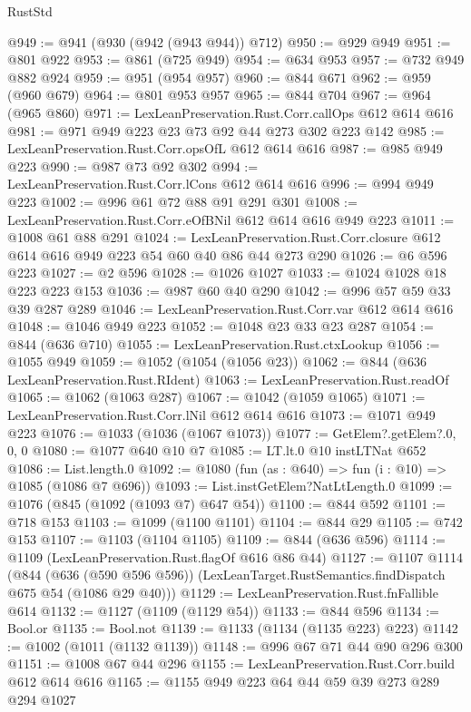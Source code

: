 \begin{lexlean}{RustStd}
\begin{coremodule}
{\begin{coremodule}
{{{{{{{{@949 := @941 (@930 (@942 (@943 @944)) @712)
@950 := @929 @949
@951 := @801 @922
@953 := @861 (@725 @949)
@954 := @634 @953
@957 := @732 @949 @882 @924
@959 := @951 (@954 @957)
@960 := @844 @671
@962 := @959 (@960 @679)
@964 := @801 @953 @957
@965 := @844 @704
@967 := @964 (@965 @860)
@971 := LexLeanPreservation.Rust.Corr.callOps @612 @614 @616
@981 := @971 @949 @223 @23 @73 @92 @44 @273 @302 @223 @142
@985 := LexLeanPreservation.Rust.Corr.opsOfL @612 @614 @616
@987 := @985 @949 @223
@990 := @987 @73 @92 @302
@994 := LexLeanPreservation.Rust.Corr.lCons @612 @614 @616
@996 := @994 @949 @223
@1002 := @996 @61 @72 @88 @91 @291 @301
@1008 := LexLeanPreservation.Rust.Corr.eOfBNil @612 @614 @616 @949 @223
@1011 := @1008 @61 @88 @291
@1024 := LexLeanPreservation.Rust.Corr.closure
    @612
    @614
    @616
    @949
    @223
    @54
    @60
    @40
    @86
    @44
    @273
    @290
@1026 := @6 @596 @223
@1027 := @2 @596
@1028 := @1026 @1027
@1033 := @1024 @1028 @18 @223 @223 @153
@1036 := @987 @60 @40 @290
@1042 := @996 @57 @59 @33 @39 @287 @289
@1046 := LexLeanPreservation.Rust.Corr.var @612 @614 @616
@1048 := @1046 @949 @223
@1052 := @1048 @23 @33 @23 @287
@1054 := @844 (@636 @710)
@1055 := LexLeanPreservation.Rust.ctxLookup
@1056 := @1055 @949
@1059 := @1052 (@1054 (@1056 @23))
@1062 := @844 (@636 LexLeanPreservation.Rust.RIdent)
@1063 := LexLeanPreservation.Rust.readOf
@1065 := @1062 (@1063 @287)
@1067 := @1042 (@1059 @1065)
@1071 := LexLeanPreservation.Rust.Corr.lNil @612 @614 @616
@1073 := @1071 @949 @223
@1076 := @1033 (@1036 (@1067 @1073))
@1077 := GetElem?.getElem?.{0, 0, 0}
@1080 := @1077 @640 @10 @7
@1085 := LT.lt.{0} @10 instLTNat @652
@1086 := List.length.{0}
@1092 := @1080 (fun (as : @640) => fun (i : @10) => @1085 (@1086 @7 @696))
@1093 := List.instGetElem?NatLtLength.{0}
@1099 := @1076 (@845 (@1092 (@1093 @7) @647 @54))
@1100 := @844 @592
@1101 := @718 @153
@1103 := @1099 (@1100 @1101)
@1104 := @844 @29
@1105 := @742 @153
@1107 := @1103 (@1104 @1105)
@1109 := @844 (@636 @596)
@1114 := @1109 (LexLeanPreservation.Rust.flagOf @616 @86 @44)
@1127 := @1107
    @1114
    (@844
      (@636 (@590 @596 @596))
      (LexLeanTarget.RustSemantics.findDispatch @675 @54 (@1086 @29 @40)))
@1129 := LexLeanPreservation.Rust.fnFallible @614
@1132 := @1127 (@1109 (@1129 @54))
@1133 := @844 @596
@1134 := Bool.or
@1135 := Bool.not
@1139 := @1133 (@1134 (@1135 @223) @223)
@1142 := @1002 (@1011 (@1132 @1139))
@1148 := @996 @67 @71 @44 @90 @296 @300
@1151 := @1008 @67 @44 @296
@1155 := LexLeanPreservation.Rust.Corr.build @612 @614 @616
@1165 := @1155 @949 @223 @64 @44 @59 @39 @273 @289 @294 @1027
}}}}}}}}
\end{coremodule}}
\end{coremodule}
\end{lexlean}
